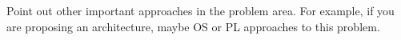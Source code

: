 
Point out other important approaches in the problem area. For example, if you 
are proposing an architecture, maybe OS or PL approaches to this problem. 

